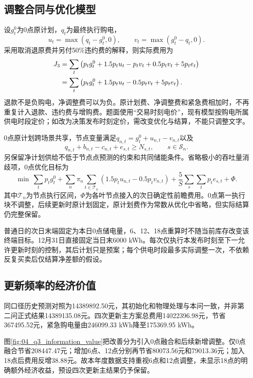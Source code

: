 \subsection{调整合同与优化模型}
设$g_t^0$为0点原计划，$q_t$为最终执行购电，
\begin{equation}
u_t=\max(q_t-g_t^0,0),\qquad v_t=\max(g_t^0-q_t,0).
\end{equation}
采用取消退原费并另付50\%违约费的解释，则实际费用为
\begin{align}
J_3&=\sum_t\left(p_tg_t^0+1.5p_tu_t-p_tv_t+0.5p_tv_t+5p_te_t\right)\notag\\
&=\sum_t\left(p_tg_t^0+1.5p_tu_t-0.5p_tv_t+5p_te_t\right).\label{eq:q3settle}
\end{align}
退款不是负购电，净调整费可以为负。原计划费、净调整费和紧急费相加时，不再重复计入退款、违约费与增购费。题面使用“交易时刻电价”，现有模型按购电所属供电时段定价；如改为决策发布时刻定价，需改变优化与结算，不能只调整文字。

0点原计划跨场景共享，节点变量满足$q_{n,t}=g_t^0+u_{n,t}-v_{n,t}$以及
\begin{equation}
q_{n,t}+b_{n,t}-c_{n,t}+e_{s,t}\ge N_{s,t},\qquad s\in\mathcal S_n.
\end{equation}
另保留净计划供给不低于节点点预测的约束和共同储能条件。省略极小的吞吐量消歧项，0点优化目标为
\begin{equation}
\min\ \sum_t p_tg_t^0+
\sum_n\pi_n\sum_{t\in\mathcal T_n}(1.5p_tu_{n,t}-0.5p_tv_{n,t})
+\frac5S\sum_s\sum_t p_te_{s,t}+\Phi.\label{eq:q3obj}
\end{equation}
其中$\mathcal T_n$为节点执行区间，$\Phi$为各叶节点接入的次日确定性前瞻费用。0点第一执行块不调整，后续更新时原计划固定，原计划费作为常数从优化中省略，但实际结算仍完整保留。

普通日的次日末端固定为本日0点储电量，6、12、18点重算时不随当前库存改变该终端目标。12月31日直接固定当日末6000 kWh。每次仅执行本发布时刻至下一允许更新时刻的控制，其后计划只是预案；每个供电时段最多实际调整一次，不依赖反复买卖后仅结算净差额的假设。

\subsection{更新频率的经济价值}

同口径历史预测对照为14389892.50元，其初始化和物理处理与本问一致，并非第二问正式结果14389135.08元。四次更新主方案总费用14022396.98元，节省367495.52元，紧急购电量由246099.33 kWh降至175369.95 kWh。

图\ref{fig:04_q3_information_value}把改善分为引入0点融合和后续新增调整。仅0点融合节省208447.47元；增加6点、12点分别再节省80073.56元和79013.36元；加入18点后费用反增38.88元。故本年度数据支持重视6点和12点调整，未显示18点的明确额外经济收益，预设四次更新主结果仍予保留。

